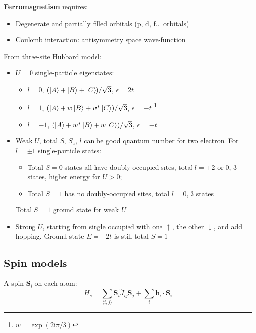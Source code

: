 \documentclass[11pt,letterpaper]{article}
\numberwithin{equation}{section} %
\renewcommand*{\vec}[1]{\bm{#1}}
\newcommand\mi{\mathrm{i}}
\newcommand{\spind}{\ensuremath{\downarrow}}
\newcommand{\spinu}{\ensuremath{\uparrow}}
\begin{document}
\textbf{Ferromagnetism} requires: 
\begin{itemize}
	\item Degenerate and partially filled orbitals (p, d, f... orbitals)
	\item Coulomb interaction: antisymmetry space wave-function
\end{itemize}
From three-site Hubbard model:
\begin{itemize}
  \item $U=0$ single-particle eigenstates: 
	  \begin{itemize}
		  \item $l=0$, $(\ket A + \ket B + \ket C)/\sqrt 3$, $\epsilon=2t$
		  \item $l=1$, $(\ket A + w\ket B + w^*\ket C)/\sqrt 3$, $\epsilon=-t$
			  \footnote{$w=\exp (2\mi \pi/3)$}
		  \item $l=-1$, $(\ket A + w^*\ket B + w\ket C)/\sqrt 3$, $\epsilon=-t$
	  \end{itemize}
  \item Weak $U$, total $S$, $S_z$, $l$ can be good quantum number for two electron.
	  For $l=\pm1$ single-particle states:  
	  \begin{itemize}
	    \item Total $S=0$ states all have doubly-occupied sites, total
			$l=\pm2$ or $0$, 3 states, higher energy for $U>0$; 
		\item Total $S=1$ has no doubly-occupied sites, total $l=0$, 3 states
	  \end{itemize}
	  Total $S=1$ ground state for weak $U$
  \item Strong $U$, starting from single occupied with one $\spinu$, the
	  other $\spind$, and add hopping. Ground state $E=-2t$ is still total
	  $S=1$
\end{itemize}

\subsection{Spin models}
\label{sub:spin_models}
A spin $\vec S_i$ on each atom: 
\begin{equation}
	H_s = \sum_{\langle i, j\rangle} \vec S_i \overleftrightarrow J_{ij}\vec S_j
	+\sum_i \vec h_i\cdot\vec S_i
\end{equation}
\end{document}
